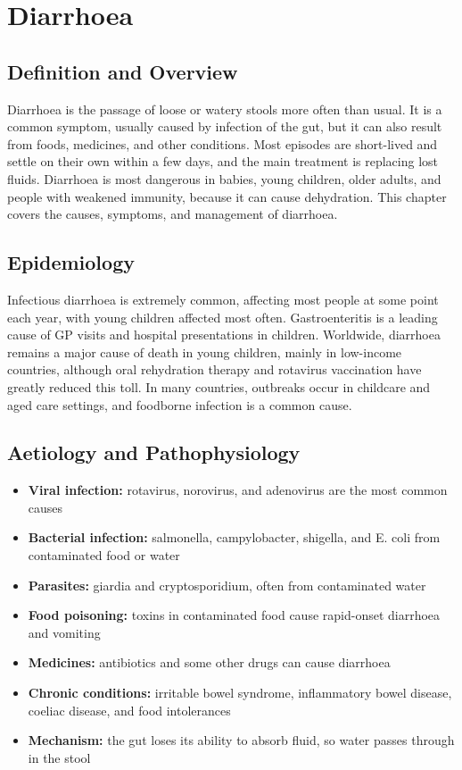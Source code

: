 \chapter{Diarrhoea}

\section*{Definition and Overview}
Diarrhoea is the passage of loose or watery stools more often than usual. It is a common symptom, usually caused by infection of the gut, but it can also result from foods, medicines, and other conditions. Most episodes are short-lived and settle on their own within a few days, and the main treatment is replacing lost fluids. Diarrhoea is most dangerous in babies, young children, older adults, and people with weakened immunity, because it can cause dehydration. This chapter covers the causes, symptoms, and management of diarrhoea.

\section*{Epidemiology}
Infectious diarrhoea is extremely common, affecting most people at some point each year, with young children affected most often. Gastroenteritis is a leading cause of GP visits and hospital presentations in children. Worldwide, diarrhoea remains a major cause of death in young children, mainly in low-income countries, although oral rehydration therapy and rotavirus vaccination have greatly reduced this toll. In many countries, outbreaks occur in childcare and aged care settings, and foodborne infection is a common cause.

\section*{Aetiology and Pathophysiology}
\begin{itemize}
    \item \textbf{Viral infection:} rotavirus, norovirus, and adenovirus are the most common causes
    \item \textbf{Bacterial infection:} salmonella, campylobacter, shigella, and E. coli from contaminated food or water
    \item \textbf{Parasites:} giardia and cryptosporidium, often from contaminated water
    \item \textbf{Food poisoning:} toxins in contaminated food cause rapid-onset diarrhoea and vomiting
    \item \textbf{Medicines:} antibiotics and some other drugs can cause diarrhoea
    \item \textbf{Chronic conditions:} irritable bowel syndrome, inflammatory bowel disease, coeliac disease, and food intolerances
    \item \textbf{Mechanism:} the gut loses its ability to absorb fluid, so water passes through in the stool
\end{itemize}

